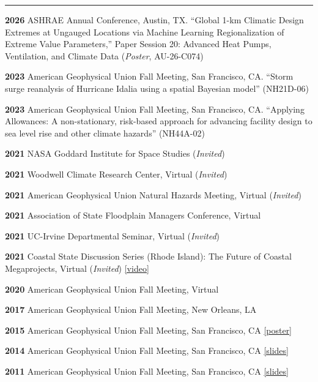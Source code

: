 \documentclass[10.5pt]{article}
\newcommand{\cvsection}[1]{%
  \par\addvspace{12pt}\pagebreak[3]%
  {\sffamily\bfseries\small\textls[80]{\MakeUppercase{#1}}}%
  \par\vspace{2pt}%
  {\color{rulegray}\hrule height 0.6pt}%
  \vspace{5pt}\nopagebreak}
\renewcommand{\section}[1]{\cvsection{#1}}
\newcommand{\yr}[1]{{\sffamily\bfseries #1}}
\begin{document}
\section{Presentations}
\begin{entries}
\item[\yr{2026}] ASHRAE Annual Conference, Austin, TX. ``Global 1-km Climatic Design Extremes at Ungauged Locations via Machine Learning Regionalization of Extreme Value Parameters,'' Paper Session 20: Advanced Heat Pumps, Ventilation, and Climate Data (\emph{Poster}, AU-26-C074)
\item[\yr{2023}] American Geophysical Union Fall Meeting, San Francisco, CA. ``Storm surge reanalysis of Hurricane Idalia using a spatial Bayesian model'' (NH21D-06)
\item[\yr{2023}] American Geophysical Union Fall Meeting, San Francisco, CA. ``Applying Allowances: A non-stationary, risk-based approach for advancing facility design to sea level rise and other climate hazards'' (NH44A-02)
\item[\yr{2021}] NASA Goddard Institute for Space Studies (\emph{Invited})
\item[\yr{2021}] Woodwell Climate Research Center, Virtual (\emph{Invited})
\item[\yr{2021}] American Geophysical Union Natural Hazards Meeting, Virtual (\emph{Invited})
\item[\yr{2021}] Association of State Floodplain Managers Conference, Virtual
\item[\yr{2021}] UC-Irvine Departmental Seminar, Virtual (\emph{Invited})
\item[\yr{2021}] Coastal State Discussion Series (Rhode Island): The Future of Coastal Megaprojects, Virtual (\emph{Invited}) \href{https://www.youtube.com/watch?v=PGbNXaviStM}{[video]}
\item[\yr{2020}] American Geophysical Union Fall Meeting, Virtual
\item[\yr{2017}] American Geophysical Union Fall Meeting, New Orleans, LA
\item[\yr{2015}] American Geophysical Union Fall Meeting, San Francisco, CA \href{https://www.dropbox.com/s/t4tsj83gemdp09a/rasmussen_AGU2015_v2_flat.pdf?dl=0}{[poster]}
\item[\yr{2014}] American Geophysical Union Fall Meeting, San Francisco, CA \href{https://www.dropbox.com/s/t0rufelj5atpuk4/2014-12%20ACP%20wetbulb%20talk%20AGU.pdf?dl=0}{[slides]}
\item[\yr{2011}] American Geophysical Union Fall Meeting, San Francisco, CA \href{https://www.dropbox.com/s/s511oapbyqasclh/AGU_ozone_temp_120511_final.pptx?dl=0}{[slides]}
\end{entries}
\end{document}
